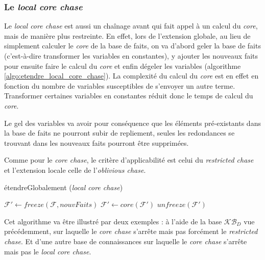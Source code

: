 \subsubsection{Le \textit{local core chase}}\label{sec:local_core_chase}

Le \textit{local core chase} est aussi un chaînage avant qui fait appel à un calcul du \textit{core}, mais de manière plus restreinte. En effet, lors de l'extension globale, au lieu de simplement calculer le \textit{core} de la base de faits, on va d'abord geler la base de faits (c'est-à-dire transformer les variables en constantes), y ajouter les nouveaux faits pour ensuite faire le calcul du \textit{core} et enfin dégeler les variables (algorithme \ref{algo:etendre_local_core_chase}). La complexité du calcul du \textit{core} est en effet en fonction du nombre de variables susceptibles de s'envoyer un autre terme. Transformer certaines variables en constantes réduit donc le temps de calcul du \textit{core}.
\par Le gel des variables va avoir pour conséquence que les éléments pré-existants dans la base de faits ne pourront subir de repliement, seules les redondances se trouvant dans les nouveaux faits pourront être supprimées.
\par Comme pour le \textit{core chase}, le critère d'applicabilité est celui du \textit{restricted chase} et l'extension locale celle de l'\textit{oblivious chase}.


\begin{algorithm}[H]\label{algo:etendre_local_core_chase}
\caption{étendreGlobalement (\textit{local core chase})}
\SetAlgoLined
\DontPrintSemicolon
\SetAlgoLined
\DontPrintSemicolon
{}
	$\mathcal{F'} \gets freeze(\mathcal{F}, nouvFaits)$\;
    $\mathcal{F'} \gets core(\mathcal{F'})$\;
    \Return $unfreeze(\mathcal{F'})$
\end{algorithm}

Cet algorithme va être illustré par deux exemples : à l'aide de la base $\mathcal{KB}_D$ vue précédemment, sur laquelle le \textit{core chase} s'arrête mais pas forcément le \textit{restricted chase}. Et d'une autre base de connaissances sur laquelle le \textit{core chase} s'arrête mais pas le \textit{local core chase}.

